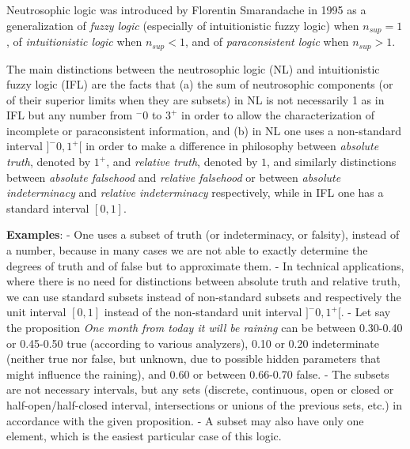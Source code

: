 \documentclass[12pt]{article}
\begin{document}
Neutrosophic logic was introduced by Florentin Smarandache in 1995 as a generalization of \emph{fuzzy logic} (especially of intuitionistic fuzzy logic) when $n_{sup} = 1$, of \emph{intuitionistic logic} when $n_{sup} < 1$, and of \emph{paraconsistent logic} when $n_{sup} > 1$.

The main distinctions between the neutrosophic logic (NL) and intuitionistic fuzzy logic (IFL) are the facts that (a) the sum of neutrosophic components (or of their superior limits when they are subsets) in NL is not necessarily 1 as in IFL but any number from $^-0$ to $3^+$ in order to allow the characterization of incomplete or paraconsistent information, and (b) in NL one uses a non-standard interval $]^-0, 1^+[$ in order to make a difference in philosophy between \emph{absolute truth}, denoted by $1^+$, and \emph{relative truth}, denoted by $1$, and similarly distinctions between \emph {absolute falsehood} and \emph {relative falsehood} or between \emph {absolute indeterminacy} and \emph {relative indeterminacy} respectively, while in IFL one has a standard interval $[0, 1]$.

{\bf  Examples}:
\newline - One uses a subset of truth (or indeterminacy, or falsity), instead of a number, because in many cases we are not able to exactly determine the degrees of truth and of false but to approximate them.
\newline - In technical applications, where there is no need for distinctions between absolute truth and relative truth, we can use standard subsets instead of non-standard subsets and respectively the unit interval $[0,1]$ instead of the non-standard unit interval $]^-0, 1^+[$.
\newline - Let say the proposition \textit{One month from today it will be raining} can be between 0.30-0.40 or 0.45-0.50 true (according to various analyzers), 0.10 or 0.20 indeterminate (neither true nor false, but unknown, due to possible hidden parameters that might influence the raining), and 0.60 or between 0.66-0.70 false.
\newline - The subsets are not necessary intervals, but any sets (discrete, continuous, open or closed or half-open/half-closed interval, intersections or unions of the previous sets, etc.) in accordance with the given proposition.
\newline - A subset may also have only one element, which is the easiest particular case of this logic.
\end{document}
